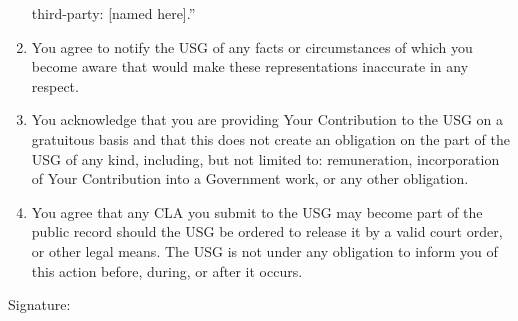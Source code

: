\documentclass[8pt]{article}
\begin{document}
\begin{Form}
\begin{enumerate}
  third-party: {[}named here{]}.''
\item
  You agree to notify the USG of any facts or circumstances of which you
  become aware that would make these representations inaccurate in any
  respect.
\item
  You acknowledge that you are providing Your Contribution to the USG on
  a gratuitous basis and that this does not create an obligation on the
  part of the USG of any kind, including, but not limited to:
  remuneration, incorporation of Your Contribution into a Government
  work, or any other obligation.
\item
  You agree that any CLA you submit to the USG may become part of the
  public record should the USG be ordered to release it by a valid court
  order, or other legal means. The USG is not under any obligation to
  inform you of this action before, during, or after it occurs.
\end{enumerate}

 \break
{} \break
{} \break
{} \break
{} \break
Signature:
\break \break
{}
\end{Form}
\end{document}
